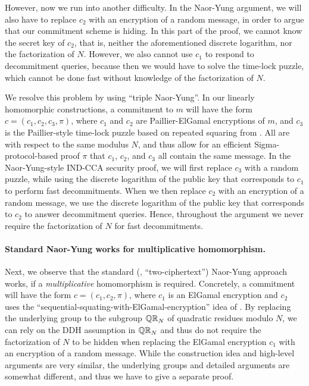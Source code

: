 However, now we run into another difficulty. In the Naor-Yung argument, we will also have to replace $c_2$ with an encryption of a random message, in order to argue that our commitment scheme is hiding. In this part of the proof, we cannot know the secret key of $c_2$, that is, neither the aforementioned discrete logarithm, nor the factorization of $N$. However, we also cannot use $c_1$ to respond to decommitment queries, because then we would have to solve the time-lock puzzle, which cannot be done fast without knowledge of the factorization of $N$.

We resolve this problem by using ``triple Naor-Yung''. In our linearly homomorphic constructions, a commitment to $m$ will have the form $c = (c_1, c_2, c_3, \pi)$, where $c_1$ and $c_2$ are Paillier-ElGamal encryptions of $m$, and $c_3$ is the Paillier-style time-lock puzzle based on repeated squaring from \cite{C:MalThy19}. All are with respect to the same modulus $N$, and thus allow for an efficient Sigma-protocol-based proof $\pi$ that $c_1$, $c_2$, and $c_3$ all contain the same message. In the Naor-Yung-style IND-CCA security proof, we will first replace $c_3$ with a random puzzle, while using the discrete logarithm of the public key that corresponds to $c_1$ to perform fast decommitments. When we then replace $c_2$ with an encryption of a random message, we use the discrete logarithm of the public key that corresponds to $c_2$ to answer decommitment queries. Hence, throughout the argument we never require the factorization of $N$ for fast decommitments.


\paragraph{Standard Naor-Yung works for multiplicative homomorphism.}
Next, we observe that the standard (\ie, ``two-ciphertext'') Naor-Yung approach works, if a \emph{multiplicative} homomorphism is required. Concretely, a commitment will have the form $c = (c_1, c_2, \pi)$, where $c_1$ is an ElGamal encryption and $c_2$ uses the ``sequential-squating-with-ElGamal-encryption'' idea of \cite{C:MalThy19}. By replacing the underlying group to the subgroup $\mathbb{QR}_N$ of quadratic residues modulo $N$, we can rely on the DDH assumption in $\mathbb{QR}_N$ and thus do not require the factorization of $N$ to be hidden when replacing the ElGamal encryption $c_1$ with an encryption of a random message.
While the construction idea and high-level arguments are very similar, the underlying groups and detailed arguments are somewhat different, and thus we have to give a separate proof.




